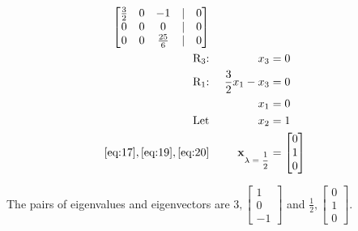 \documentclass{article}
\begin{document}
\begin{align}
\begin{bmatrix}
    \frac{3}{2} & 0 & -1 &|& 0\\
    0 & 0 & 0 &|& 0\\
    0 & 0 & \frac{25}{6} &|& 0
    \end{bmatrix} &\text{ }
    \\
    \label{eq:17}
    \text{R\textsubscript{3}:} && x_3 &= 0
    \\
    \label{eq:18}
    \text{R\textsubscript{1}:} && \frac{3}{2}x_1 -x_3 &= 0
    \\
    \label{eq:19}
    && x_1 &= 0
    \\
    \label{eq:20}
    \text{Let} && x_2 &= 1
    \\
    \label{eq:21}
    \eqref{eq:17}, \eqref{eq:19}, \eqref{eq:20} && \textbf{x\textsubscript{$\lambda=\frac{1}{2}$}} &= \begin{bmatrix}
    0\\1\\0
    \end{bmatrix}
\end{align}

The pairs of eigenvalues and eigenvectors are $3, \begin{bmatrix} 1\\0\\-1 \end{bmatrix}$ and $\frac{1}{2}, \begin{bmatrix} 0\\1\\0\end{bmatrix}$.
\end{document}
